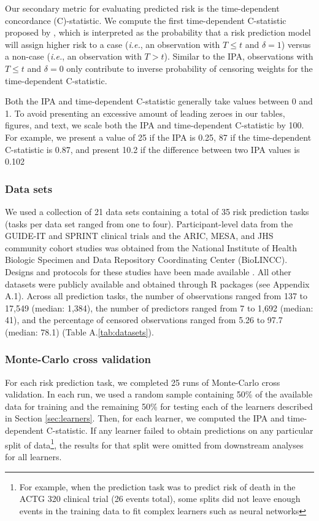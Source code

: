 \documentclass[12pt]{article}\usepackage[]{graphicx}\usepackage[]{xcolor}
\newcommand{\ie}{\textit{i.e.}}
\newcommand{\secref}[1]{Section \ref{#1}}
\newcommand{\tabrefAppendix}[1]{Table A.\ref{#1}}
\begin{document}
Our secondary metric for evaluating predicted risk is the time-dependent concordance (C)-statistic. We compute the first time-dependent C-statistic proposed by \citet[][Equation~3]{blanche2013estimating}, which is interpreted as the probability that a risk prediction model will assign higher risk to a case (\ie, an observation with $T \leq t$ and $\delta = 1$) versus a non-case (\ie, an observation with $T > t$). Similar to the IPA, observations with $T \leq t$ and $\delta = 0$ only contribute to inverse probability of censoring weights for the time-dependent C-statistic.

Both the IPA and time-dependent C-statistic generally take values between 0 and 1. To avoid presenting an excessive amount of leading zeroes in our tables, figures, and text, we scale both the IPA and time-dependent C-statistic by 100. For example, we present a value of 25 if the IPA is 0.25, 87 if the time-dependent C-statistic is 0.87, and present 10.2 if the difference between two IPA values is 0.102

\subsubsection{Data sets}

We used a collection of 21 data sets containing a total of 35 risk prediction tasks (tasks per data set ranged from one to four). Participant-level data from the GUIDE-IT and SPRINT clinical trials and the ARIC, MESA, and JHS community cohort studies was obtained from the National Institute of Health Biologic Specimen and Data Repository Coordinating Center (BioLINCC). Designs and protocols for these studies have been made available \citep{aric1989atherosclerosis, bild2002multi, felker2017effect, sprint2015randomized, taylor2005toward}. All other datasets were publicly available and obtained through R packages (see Appendix A.1). Across all prediction tasks, the number of observations ranged from 137 to 17,549 (median: 1,384), the number of predictors ranged from 7 to 1,692 (median: 41), and the percentage of censored observations ranged from 5.26 to 97.7 (median: 78.1) (\tabrefAppendix{tab:datasets}).

\subsubsection{Monte-Carlo cross validation}

For each risk prediction task, we completed 25 runs of Monte-Carlo cross validation. In each run, we used a random sample containing 50\% of the available data for training and the remaining 50\% for testing each of the learners described in \secref{sec:learners}. Then, for each learner, we computed the IPA and time-dependent C-statistic. If any learner failed to obtain predictions on any particular split of data\footnote{For example, when the prediction task was to predict risk of death in the ACTG 320 clinical trial (26 events total), some splits did not leave enough events in the training data to fit complex learners such as neural networks}, the results for that split were omitted from downstream analyses for all learners.
\end{document}
